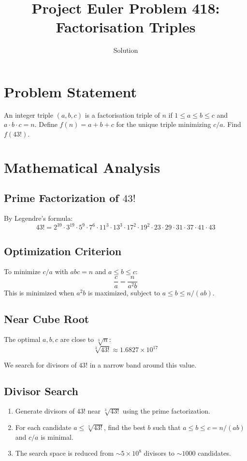 \documentclass[12pt]{article}
\title{Project Euler Problem 418: Factorisation Triples}
\author{Solution}
\date{}
\begin{document}
\maketitle

\section{Problem Statement}
An integer triple $(a, b, c)$ is a factorisation triple of $n$ if $1 \leq a \leq b \leq c$ and $a \cdot b \cdot c = n$. Define $f(n) = a + b + c$ for the unique triple minimizing $c/a$. Find $f(43!)$.

\section{Mathematical Analysis}

\subsection{Prime Factorization of $43!$}
By Legendre's formula:
\[
43! = 2^{39} \cdot 3^{19} \cdot 5^9 \cdot 7^6 \cdot 11^3 \cdot 13^3 \cdot 17^2 \cdot 19^2 \cdot 23 \cdot 29 \cdot 31 \cdot 37 \cdot 41 \cdot 43
\]

\subsection{Optimization Criterion}
To minimize $c/a$ with $abc = n$ and $a \leq b \leq c$:
\[
\frac{c}{a} = \frac{n}{a^2 b}
\]
This is minimized when $a^2 b$ is maximized, subject to $a \leq b \leq n/(ab)$.

\subsection{Near Cube Root}
The optimal $a, b, c$ are close to $\sqrt[3]{n}$:
\[
\sqrt[3]{43!} \approx 1.6827 \times 10^{17}
\]

We search for divisors of $43!$ in a narrow band around this value.

\subsection{Divisor Search}
\begin{enumerate}
    \item Generate divisors of $43!$ near $\sqrt[3]{43!}$ using the prime factorization.
    \item For each candidate $a \leq \sqrt[3]{43!}$, find the best $b$ such that $a \leq b \leq c = n/(ab)$ and $c/a$ is minimal.
    \item The search space is reduced from $\sim 5 \times 10^8$ divisors to $\sim 1000$ candidates.
\end{enumerate}
\end{document}
